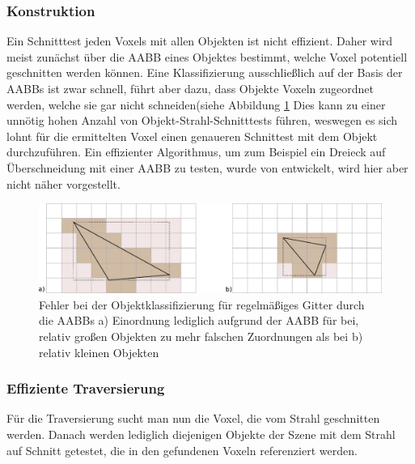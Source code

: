 \subsubsection{Konstruktion}
\label{sec:gridconstruction}
Ein Schnitttest jeden Voxels mit allen Objekten ist nicht effizient. Daher wird meist zunächst über die AABB eines Objektes bestimmt, welche Voxel potentiell geschnitten werden können. Eine Klassifizierung ausschließlich auf der Basis der AABBs ist zwar schnell, führt aber dazu, dass Objekte Voxeln zugeordnet werden, welche sie gar nicht schneiden(siehe Abbildung \ref{fig:gridconstr} Dies kann zu einer unnötig hohen Anzahl von Objekt-Strahl-Schnitttests führen, weswegen es sich lohnt für die ermittelten Voxel einen genaueren Schnittest mit dem Objekt durchzuführen.
Ein effizienter Algorithmus, um zum Beispiel ein Dreieck auf Überschneidung mit einer AABB zu testen, wurde von \cite{AkenineMoller01} entwickelt, wird hier aber nicht näher vorgestellt.
\begin{figure}
\begin{center}
\includegraphics[width=1.0\textwidth]{images/gridconstr.pdf}
\caption[Fehler bei der Objektklassifizierung für regelmäßiges Gitter durch die AABBs]{Fehler bei der Objektklassifizierung für regelmäßiges Gitter durch die AABBs a) Einordnung lediglich aufgrund der AABB für bei, relativ großen Objekten zu mehr falschen Zuordnungen als bei b) relativ kleinen Objekten }
\label{fig:gridconstr}\end{center}
\end{figure}

\subsubsection{Effiziente Traversierung}
\label{sec:fastgrid}
Für die Traversierung sucht man nun die Voxel, die vom Strahl geschnitten werden. Danach werden lediglich diejenigen Objekte der Szene mit dem Strahl auf Schnitt getestet, die in den gefundenen Voxeln referenziert werden.

